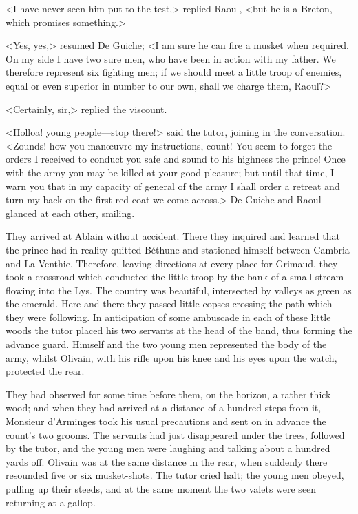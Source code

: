 <I have never seen him put to the test,> replied Raoul, <but he is a Breton, which promises something.>

<Yes, yes,> resumed De Guiche; <I am sure he can fire a musket when required. On my side I have two sure men, who have been in action with my father. We therefore represent six fighting men; if we should meet a little troop of enemies, equal or even superior in number to our own, shall we charge them, Raoul?>

<Certainly, sir,> replied the viscount.

<Holloa! young people—stop there!> said the tutor, joining in the conversation. <Zounds! how you manœuvre my instructions, count! You seem to forget the orders I received to conduct you safe and sound to his highness the prince! Once with the army you may be killed at your good pleasure; but until that time, I warn you that in my capacity of general of the army I shall order a retreat and turn my back on the first red coat we come across.> De Guiche and Raoul glanced at each other, smiling.

They arrived at Ablain without accident. There they inquired and learned that the prince had in reality quitted Béthune and stationed himself between Cambria and La Venthie. Therefore, leaving directions at every place for Grimaud, they took a crossroad which conducted the little troop by the bank of a small stream flowing into the Lys. The country was beautiful, intersected by valleys as green as the emerald. Here and there they passed little copses crossing the path which they were following. In anticipation of some ambuscade in each of these little woods the tutor placed his two servants at the head of the band, thus forming the advance guard. Himself and the two young men represented the body of the army, whilst Olivain, with his rifle upon his knee and his eyes upon the watch, protected the rear.

They had observed for some time before them, on the horizon, a rather thick wood; and when they had arrived at a distance of a hundred steps from it, Monsieur d'Arminges took his usual precautions and sent on in advance the count's two grooms. The servants had just disappeared under the trees, followed by the tutor, and the young men were laughing and talking about a hundred yards off. Olivain was at the same distance in the rear, when suddenly there resounded five or six musket-shots. The tutor cried halt; the young men obeyed, pulling up their steeds, and at the same moment the two valets were seen returning at a gallop.

